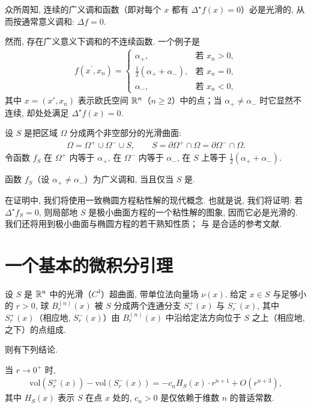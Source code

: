 众所周知, 连续的广义调和函数（即对每个 $x$ 都有 $\Delta^\star f(x) = 0$）必是光滑的, 从而按通常意义调和: $\Delta f = 0$.

然而, 存在广义意义下调和的不连续函数. 一个例子是
\begin{align*}
  f(x^{\prime},x_{n})=
  \begin{cases}
    \alpha_{+}, & \text{若 } x_{n}>0,\\
    \frac{1}{2}\left(\alpha_{+}+\alpha_{-}\right), & \text{若 } x_{n}=0,\\
    \alpha_{-}, & \text{若 } x_{n}<0,
  \end{cases}
\end{align*}
其中 $x = (x', x_n)$ 表示欧氏空间 $\mathbb{R}^n$（$n \geq 2$）中的点；当 $\alpha_+ \neq \alpha_-$ 时它显然不连续, 却处处满足 $\Delta^\star f(x) = 0$.

设 $S$ 是把区域 $\Omega$ 分成两个非空部分的光滑曲面:
\begin{align*}
  \Omega=\Omega^{+}\cup\Omega^{-}\cup S,\qquad
  S=\partial\Omega^{+}\cap\Omega=\partial\Omega^{-}\cap\Omega.
\end{align*}
令函数 $f_S$ 在 $\Omega^+$ 内等于 $\alpha_+$, 在 $\Omega^-$ 内等于 $\alpha_-$, 在 $S$ 上等于 $\frac{1}{2}(\alpha_++\alpha_-)$.

\begin{theorem}\label{thm:1.6}
函数 $f_S$（设 $\alpha_+ \neq \alpha_-$）为广义调和, 当且仅当 $S$ 是.
\end{theorem}

在证明中, 我们将使用一致椭圆方程粘性解的现代概念. 也就是说, 我们将证明: 若 $\Delta^\star f_S = 0$, 则局部地 $S$ 是极小曲面方程的一个粘性解的图象, 因而它必是光滑的. 我们还将用到极小曲面与椭圆方程的若干熟知性质；\cite{b22} 与 \cite{b34} 是合适的参考文献.

\section*{一个基本的微积分引理}

设 $S$ 是 $\mathbb{R}^n$ 中的光滑（$C^4$）超曲面, 带单位法向量场 $\nu(x)$. 给定 $x \in S$ 与足够小的 $r > 0$, 球 $B_r^{(n)}(x)$ 被 $S$ 分成两个连通分支 $S_r^+(x)$ 与 $S_r^-(x)$, 其中 $S_r^+(x)$（相应地, $S_r^-(x)$）由 $B_r^{(n)}(x)$ 中沿给定法方向位于 $S$ 之上（相应地, 之下）的点组成.

则有下列结论.

\begin{lemma}\label{lem:1.7}
当 $r \to 0^+$ 时,
\begin{align*}
  \mathrm{vol}(S_{r}^{+}(x))-\mathrm{vol}(S_{r}^{-}(x))
  =-c_{n} H_{S}(x)\cdot r^{n+1}+O(r^{n+3}),
\end{align*}
其中 $H_{S}(x)$ 表示 $S$ 在点 $x$ 处的, $c_{n} > 0$ 是仅依赖于维数 $n$ 的普适常数.
\end{lemma}

